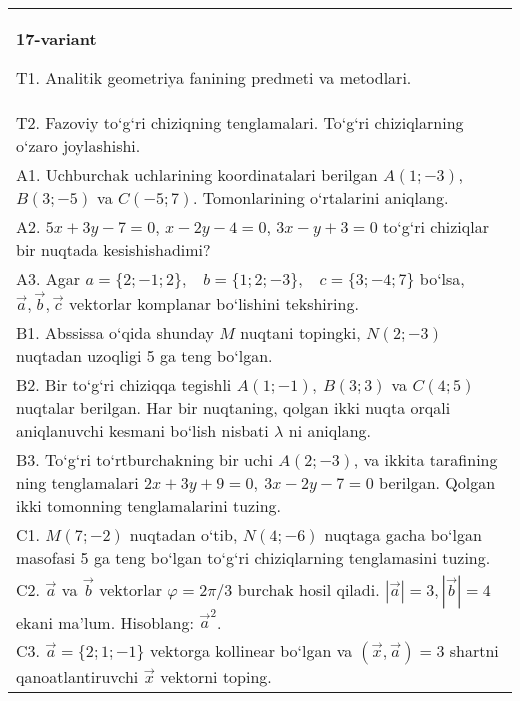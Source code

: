 \documentclass{article}
\begin{document}
\begin{tabular}{m{17cm}}
\textbf{17-variant}

T1. Analitik geometriya fanining predmeti va metodlari.
 \\
T2. 
Fazoviy to‘g‘ri chiziqning tenglamalari. To‘g‘ri chiziqlarning o‘zaro joylashishi.
 \\
A1. 
Uchburchak uchlarining koordinatalari berilgan
$A (1;-3) $, $B (3;-5) $ va $C (-5;7) $. Tomonlarining o‘rtalarini
aniqlang.
 \\
A2. 
$5x+3y-7=0$, $x-2y-4=0$, $3x-y+3=0$
to‘g‘ri chiziqlar bir nuqtada kesishishadimi?
 \\
A3. 
Agar \(a = \{ 2; - 1;2\}, \ \ \ \ b = \{ 1;2; - 3\}, \ \ \ \ c = \{ 3; - 4;7\}\) bo‘lsa, $\overrightarrow{a}, \overrightarrow{b}, \overrightarrow{c}$ vektorlar komplanar bo‘lishini tekshiring.
 \\
B1. 
Abssissa o‘qida shunday $M$ nuqtani topingki,
\(N (2;-3) \) nuqtadan uzoqligi 5 ga teng bo‘lgan.
 \\
B2. 
Bir to‘g‘ri chiziqqa tegishli \(A (1;-1),\ B (3;3) \) va
\(C (4;5) \) nuqtalar berilgan. Har bir nuqtaning, qolgan ikki nuqta orqali aniqlanuvchi kesmani bo‘lish nisbati $\lambda$ ni aniqlang.
 \\
B3. 
To‘g‘ri to‘rtburchakning bir uchi \(A (2;-3) \), va ikkita tarafining
ning tenglamalari \(2x+3y+9=0,\ 3x-2y-7=0\)
berilgan. Qolgan ikki tomonning tenglamalarini tuzing.
 \\
C1. 
\(M (7;-2) \) nuqtadan o‘tib, \(N (4;-6) \) nuqtaga
gacha bo‘lgan masofasi 5 ga teng bo‘lgan to‘g‘ri chiziqlarning tenglamasini tuzing.
 \\
C2. 
$\vec{a}$ va $\vec{b}$ vektorlar $\varphi = 2\pi/3$ burchak hosil qiladi. $|\vec{a}| = 3,|\vec{b}| = 4$ ekani ma’lum. Hisoblang:
${\vec{a}}^{2}$.
 \\
C3. 
$\vec{a} = \{ 2;1; - 1\}$ vektorga kollinear bo‘lgan va $\left(\vec{x},\vec{a} \right) = 3$ shartni qanoatlantiruvchi $\vec{x}$ vektorni toping.
 \\

\end{tabular}
\vspace{1cm}
\end{document}
